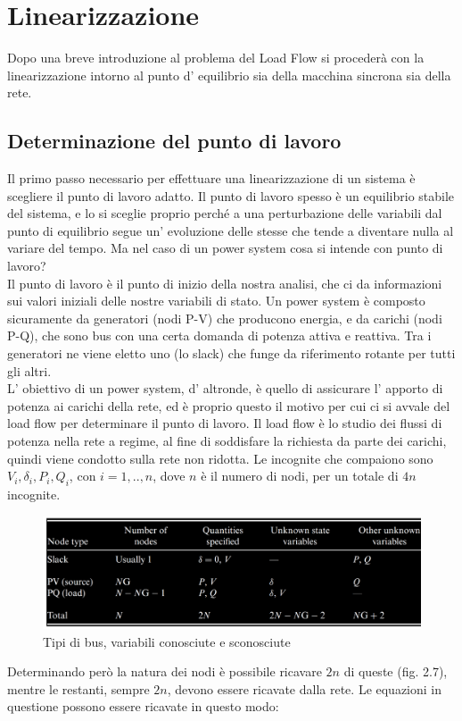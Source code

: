 \documentclass[Lau,noexaminfo]{sapthesis}
\begin{document}
	\section{Linearizzazione}
	Dopo una breve introduzione al problema del Load Flow si procederà con la linearizzazione intorno al punto d' equilibrio sia della macchina sincrona sia della rete.
	\subsection{Determinazione del punto di lavoro}
	Il primo passo necessario per effettuare una linearizzazione di un sistema è scegliere il punto di lavoro adatto. Il punto di lavoro spesso è un equilibrio stabile del sistema, e lo si sceglie proprio perché a una perturbazione delle variabili dal punto di equilibrio segue un' evoluzione delle stesse che tende a diventare nulla al variare del tempo. Ma nel caso di un power system cosa si intende con punto di lavoro?\\
	Il punto di lavoro è il punto di inizio della nostra analisi, che ci da informazioni sui valori iniziali delle nostre variabili di stato. Un power system è composto sicuramente da generatori (nodi P-V) che producono energia, e da carichi (nodi P-Q), che sono bus con una certa domanda di potenza attiva e reattiva. Tra i generatori ne viene eletto uno (lo slack) che funge da riferimento rotante per tutti gli altri.\\ L' obiettivo di un power system, d' altronde, è quello di assicurare l' apporto di potenza ai carichi della rete, ed è proprio questo il motivo per cui ci si avvale del load flow per determinare il punto di lavoro. Il load flow è lo studio dei flussi di potenza nella rete a regime, al fine di soddisfare la richiesta da parte dei carichi, quindi viene condotto sulla rete non ridotta. Le incognite che compaiono sono $V_i,\delta_i,P_i,Q_i$, con $i=1,..,n$, dove $n$ è il numero di nodi, per un totale di $4n$ incognite.
	\begin{figure}
		\centering
		\includegraphics[height=0.2\textheight]{tipidibus}
		\caption{Tipi di bus, variabili conosciute e sconosciute}
	\end{figure} Determinando però la natura dei nodi è possibile ricavare $2n$ di queste (fig. 2.7), mentre le restanti, sempre $2n$, devono essere ricavate dalla rete. Le equazioni in questione possono essere ricavate in questo modo:\\
\end{document}
